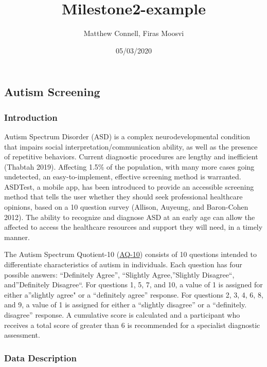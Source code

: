 \documentclass[
]{article}
\title{Milestone2-example}
\author{Matthew Connell, Firas Moosvi}
\date{05/03/2020}
\begin{document}
\maketitle

\hypertarget{autism-screening}{%
\subsection{Autism Screening}\label{autism-screening}}

\hypertarget{introduction}{%
\subsubsection{Introduction}\label{introduction}}

Autism Spectrum Disorder (ASD) is a complex neurodevelopmental condition
that impairs social interpretation/communication ability, as well as the
presence of repetitive behaviors. Current diagnostic procedures are
lengthy and inefficient (Thabtah 2019). Affecting 1.5\% of the
population, with many more cases going undetected, an easy-to-implement,
effective screening method is warranted. ASDTest, a mobile app, has been
introduced to provide an accessible screening method that tells the user
whether they should seek professional healthcare opinions, based on a 10
question survey (Allison, Auyeung, and Baron-Cohen 2012). The ability to
recognize and diagnose ASD at an early age can allow the affected to
access the healthcare resources and support they will need, in a timely
manner.

The Autism Spectrum Quotient-10
(\href{https://www.nice.org.uk/guidance/cg142/resources/autism-spectrum-quotient-aq10-test-pdf-186582493}{AQ-10})
consists of 10 questions intended to differentiate characteristics of
autism in individuals. Each question has four possible answers:
``Definitely Agree'', ``Slightly Agree,''Slightly Disagree``,
and''Definitely Disagree``. For questions 1, 5, 7, and 10, a value of 1
is assigned for either a''slightly agree" or a ``definitely agree''
response. For questions 2, 3, 4, 6, 8, and 9, a value of 1 is assigned
for either a ``slightly disagree'' or a ``definitely. disagree''
response. A cumulative score is calculated and a participant who
receives a total score of greater than 6 is recommended for a specialist
diagnostic assessment.

\hypertarget{data-description}{%
\subsubsection{Data Description}\label{data-description}}
\end{document}
